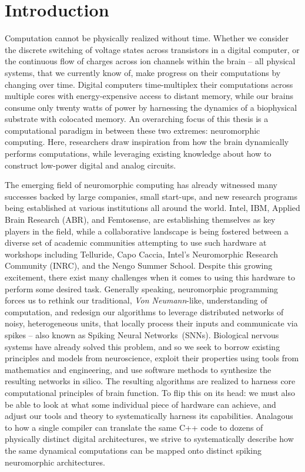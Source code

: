 \chapter{Introduction}

Computation cannot be physically realized without time.
Whether we consider the discrete switching of voltage states across transistors in a
digital computer,
or the continuous flow of charges across ion channels within the brain -- 
all physical systems, that we currently know of, make progress on their computations
by changing over time.
Digital computers time-multiplex their computations across multiple cores with energy-expensive access to distant memory, while our brains consume only twenty watts of power by harnessing the dynamics of a biophysical substrate with colocated memory.
An overarching focus of this thesis is a computational paradigm
in between these two extremes: neuromorphic computing.
Here, researchers draw inspiration from how the
brain dynamically performs computations, while leveraging existing knowledge about
how to construct low-power digital and analog circuits.

The emerging field of neuromorphic computing has already
witnessed many successes backed by large companies, small start-ups, and new research
programs being established at various institutions all around the world.
Intel, IBM, Applied Brain Research (ABR), and Femtosense, are establishing themselves as key players in the field, while a collaborative landscape is being fostered between a diverse set of academic communities attempting to use such hardware at workshops including Telluride, Capo Caccia, Intel's Neuromorphic Research Community (INRC), and the Nengo Summer School.
Despite this growing excitement, there exist many challenges when it comes to using
this hardware to perform some desired task.
Generally speaking, neuromorphic programming forces us to rethink our traditional,
\emph{Von Neumann}-like, understanding of computation, and redesign our algorithms to leverage distributed networks of noisy, heterogeneous units, that locally process their inputs and communicate via spikes -- also known as Spiking Neural Networks~(SNNs).
Biological nervous systems have already solved this problem, and so we seek to borrow existing
principles and models from neuroscience, exploit their properties using tools from mathematics and engineering,
and use software methods to synthesize the resulting networks in silico.
The resulting algorithms are realized to harness core computational principles of brain function.
To flip this on its head: we must also be able to look at what some individual piece of hardware can achieve,
and adjust our tools and theory to systematically harness its capabilities.
Analagous to how a single compiler can translate the same C++ code
to dozens of physically distinct digital architectures, we strive to systematically describe
how the same dynamical computations can be mapped onto distinct spiking neuromorphic architectures.

